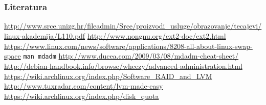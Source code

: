 \documentclass[t]{beamer}
\begin{document}
\section*{}
\begin{frame}
	\frametitle{Literatura}
    \url{http://www.srce.unizg.hr/fileadmin/Srce/proizvodi_usluge/obrazovanje/tecajevi/linux-akademija/L110.pdf}
    \url{http://www.nongnu.org/ext2-doc/ext2.html}
    \url{https://www.linux.com/news/software/applications/8208-all-about-linux-swap-space}
	\texttt{man mdadm}
	\url{http://www.ducea.com/2009/03/08/mdadm-cheat-sheet/}
	\vfill
	\url{http://debian-handbook.info/browse/wheezy/advanced-administration.html}\\
	\url{https://wiki.archlinux.org/index.php/Software_RAID_and_LVM}\\
	\url{http://www.tuxradar.com/content/lvm-made-easy}
	\vfill
	\url{https://wiki.archlinux.org/index.php/disk_quota}
\end{frame}
\end{document}
